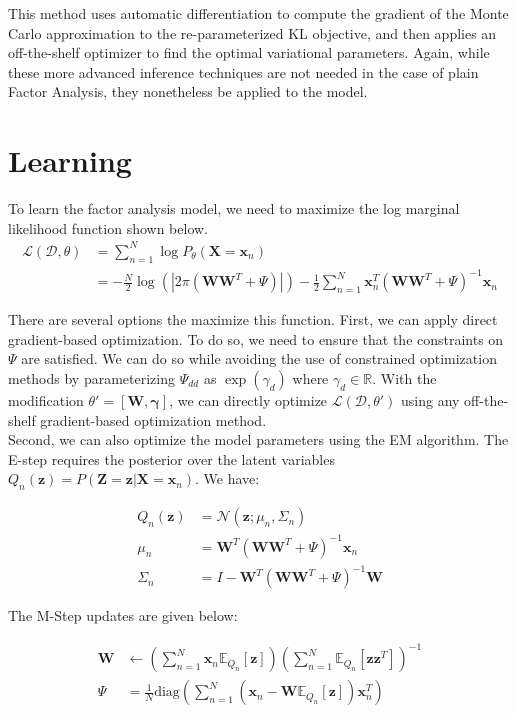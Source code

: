 \documentclass[11pt]{article}
\newcommand{\mbf}[1]{{\mathbf{#1}}}
\begin{document}
This method uses automatic differentiation to compute the gradient of the Monte Carlo  approximation
to the re-parameterized KL objective, and then applies an off-the-shelf optimizer
to find the optimal variational parameters. Again, while these more advanced inference 
techniques are not needed in the case of plain Factor Analysis, they nonetheless 
be applied to the model.


\section{Learning}

To learn the factor analysis model, we need to maximize the log marginal likelihood
function shown below.
%
\begin{align}
\label{eq:logmarglik}
\mathcal{L}(\mathcal{D},\theta) &= \sum_{n=1}^N \log P_{\theta}(\mbf{X}=\mbf{x}_n)\\
&=-\frac{N}{2}\log(|2\pi(\mbf{WW}^T+\Psi)|)-\frac{1}{2}\sum_{n=1}^N \mbf{x}_n^T(\mbf{WW}^T+\Psi)^{-1}\mbf{x}_n
\end{align}

There are several options the maximize this function. First, we can apply direct
gradient-based optimization. To do so, we need to ensure that the constraints
on $\Psi$ are satisfied. We can do so while avoiding the use of constrained
optimization methods by parameterizing $\Psi_{dd}$ as $\exp(\gamma_d)$ where
$\gamma_d\in \mathbb{R}$. With the modification $\theta'=[\mbf{W},\mbf{\gamma}]$, 
we can directly optimize $\mathcal{L}(\mathcal{D},\theta')$
using any off-the-shelf gradient-based optimization method. \\

Second, we can also optimize the model parameters using the EM algorithm. 
The E-step requires the posterior over the latent 
variables $Q_n(\mbf{z}) = P(\mbf{Z}=\mbf{z}|\mbf{X}=\mbf{x}_n)$.
We have:

\begin{align}
	\label{eq:e-step}
 	Q_n(\mbf{z})&=\mathcal{N}(\mbf{z}; \mu_n, \Sigma_n)\\
	\mu_n &= \mbf{W}^T(\mbf{W}\mbf{W}^T+\Psi)^{-1}\mbf{x}_n\\
	\Sigma_n &= I - \mbf{W}^T(\mbf{W}\mbf{W}^T+\Psi)^{-1}\mbf{W}
\end{align}

The M-Step updates are given below:

\begin{align}
	\label{eq:m-step}
	\mbf{W} &\leftarrow \left(\sum_{n=1}^N\mbf{x}_n\mathbb{E}_{Q_n}[\mbf{z}]\right) 
	\left(\sum_{n=1}^N \mathbb{E}_{Q_n}[\mbf{z}\mbf{z}^T]\right)^{-1}\\
	\Psi &= \frac{1}{N}\mbox{diag}\left(\sum_{n=1}^N(\mbf{x}_n - \mbf{W}\mathbb{E}_{Q_n}[\mbf{z}])\mbf{x}_n^T\right)
\end{align}
\end{document}
